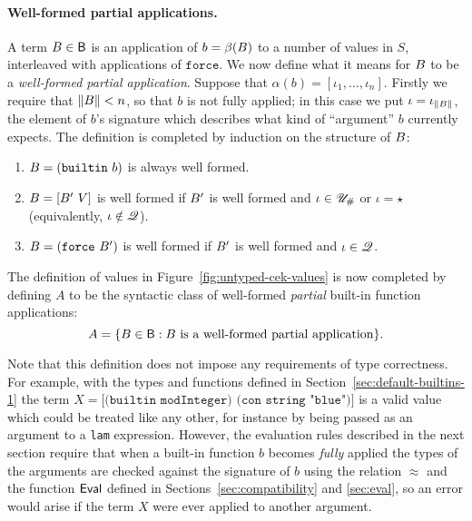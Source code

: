 \paragraph{Well-formed partial applications.} A term $B \in \mathsf{B}$ is
an application of $b = \beta(B)$ to a number of values in $S$, interleaved
with applications of $\texttt{force}$.  We now define what it means for $B$
to be a \textit{well-formed partial application}.  Suppose that $\alpha(b) =
[\iota_1, \ldots, \iota_n]$. Firstly we require that $\lVert B \rVert < n$, so
that $b$ is not fully applied; in this case we put
$\iota=\iota_{\lVert B \rVert}$, the element of $b$'s signature which describes
what kind of ``argument'' $b$ currently expects.  The definition is completed by
induction on the structure of $B$:
\begin{enumerate}
\item $B=\mathtt{(builtin}\ b \mathtt{)}$ is always well formed.
\item $\pba=\mathtt{[}\pba'\ V\mathtt{]}$ is well formed if $B'$ is
  well formed and $\iota \in {\mathscr{U}_{\#}}$ or $\iota = \star$ (equivalently, $\iota \notin \mathscr{Q}$).
\item $\pba=\mathtt{(force}\ \pba'\mathtt{)}$ is well formed if $B'$ is
  well formed and $\iota \in \mathscr{Q}$.
\end{enumerate}



\medskip
\noindent The definition of values in Figure~\ref{fig:untyped-cek-values} is now
completed by defining $A$ to be the syntactic class of well-formed
\textit{partial} built-in function applications:
$$
A = \{B \in \mathsf{B}: B \text{ is a well-formed partial application} \}.
$$

\noindent Note that this definition does not impose any requirements of type
correctness.  For example, with the types and functions defined in
Section~\ref{sec:default-builtins-1} the term $X =\texttt{[(builtin
    modInteger) (con string "blue")]}$ is a valid value which could be
treated like any other, for instance by being passed as an argument to a
\texttt{lam} expression.  However, the evaluation rules described in the next
section require that when a built-in function $b$ becomes \textit{fully} applied
the types of the arguments are checked against the signature of $b$ using the
relation $\approx$ and the function $\mathsf{Eval}$ defined in
Sections~\ref{sec:compatibility} and \ref{sec:eval}, so an error would arise if
the term $X$ were ever applied to another argument.
